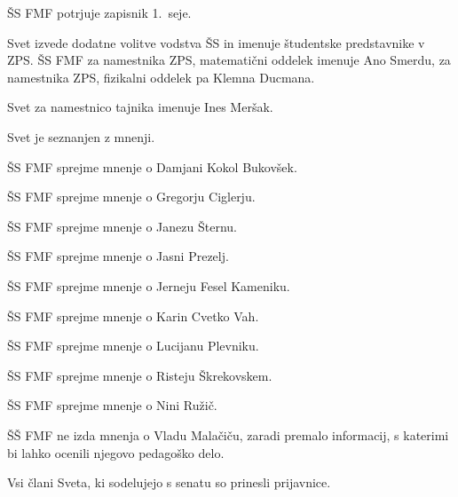\documentclass{seja}
\begin{document}
\begin{ad}
\item
\begin{sklep*}
  ŠS FMF potrjuje zapisnik 1.~seje.
\end{sklep*}

\item
Svet  izvede dodatne volitve vodstva ŠS in  imenuje študentske predstavnike v ZPS.
ŠS FMF za namestnika ZPS, matematični oddelek imenuje Ano Smerdu, za namestnika
ZPS, fizikalni oddelek pa Klemna Ducmana.

Svet za namestnico tajnika imenuje Ines Meršak.

\item
Svet je seznanjen z mnenji.

\begin{sklep*} ŠS FMF sprejme mnenje o Damjani Kokol Bukovšek.  \end{sklep*}
\begin{sklep*} ŠS FMF sprejme mnenje o Gregorju Ciglerju.       \end{sklep*}
\begin{sklep*} ŠS FMF sprejme mnenje o Janezu Šternu.           \end{sklep*}
\begin{sklep*} ŠS FMF sprejme mnenje o Jasni Prezelj.           \end{sklep*}
\begin{sklep*} ŠS FMF sprejme mnenje o Jerneju Fesel Kameniku.  \end{sklep*}
\begin{sklep*} ŠS FMF sprejme mnenje o Karin Cvetko Vah.        \end{sklep*}
\begin{sklep*} ŠS FMF sprejme mnenje o Lucijanu Plevniku.       \end{sklep*}
\begin{sklep*} ŠS FMF sprejme mnenje o Risteju Škrekovskem.     \end{sklep*}
\begin{sklep*} ŠS FMF sprejme mnenje o Nini Ružič.              \end{sklep*}

\begin{sklep*} ŠŠ FMF ne izda mnenja o Vladu Malačiču, zaradi premalo informacij, s katerimi bi lahko ocenili njegovo pedagoško delo.        \end{sklep*}

\item
Vsi člani Sveta, ki sodelujejo s senatu so prinesli prijavnice.


\end{ad}
\end{document}
